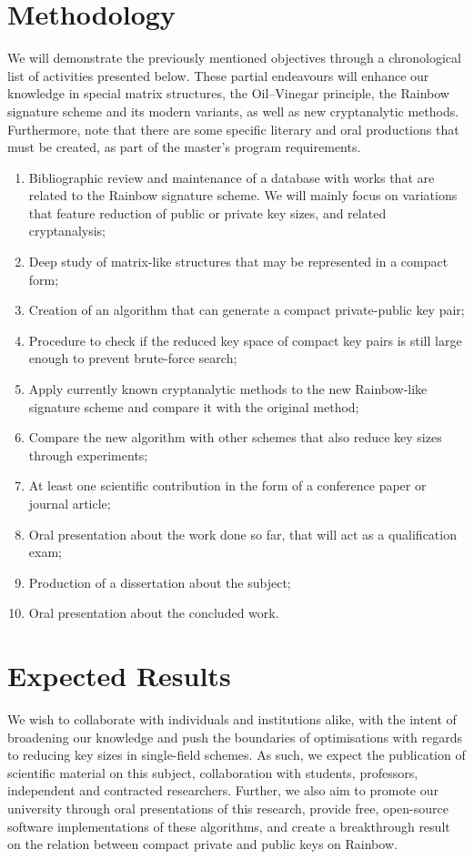 \documentclass[10pt]{article}
\begin{document}
\section{Methodology}

We will demonstrate the previously mentioned objectives through a chronological list of activities presented below. These partial endeavours will enhance our knowledge in special matrix structures, the Oil--Vinegar principle, the Rainbow signature scheme and its modern variants, as well as new cryptanalytic methods. Furthermore, note that there are some specific literary and oral productions that must be created, as part of the master's program requirements.

\begin{enumerate}[label=\alph*.]
    \item Bibliographic review and maintenance of a database with works that are related to the Rainbow signature scheme. We will mainly focus on variations that feature reduction of public or private key sizes, and related cryptanalysis;
    \item Deep study of matrix-like structures that may be represented in a compact form;
    \item Creation of an algorithm that can generate a compact private-public key pair;
    \item Procedure to check if the reduced key space of compact key pairs is still large enough to prevent brute-force search;
    \item Apply currently known cryptanalytic methods to the new Rainbow-like signature scheme and compare it with the original method;
    \item Compare the new algorithm with other schemes that also reduce key sizes through experiments;
    \item At least one scientific contribution in the form of a conference paper or journal article;
    \item Oral presentation about the work done so far, that will act as a qualification exam;
    \item Production of a dissertation about the subject;
    \item Oral presentation about the concluded work.
\end{enumerate}

\section{Expected Results}

We wish to collaborate with individuals and institutions alike, with the intent of broadening our knowledge and push the boundaries of optimisations with regards to reducing key sizes in single-field schemes. As such, we expect the publication of scientific material on this subject, collaboration with students, professors, independent and contracted researchers. Further, we also aim to promote our university through oral presentations of this research, provide free, open-source software implementations of these algorithms, and create a breakthrough result on the relation between compact private and public keys on Rainbow.



\end{document}
